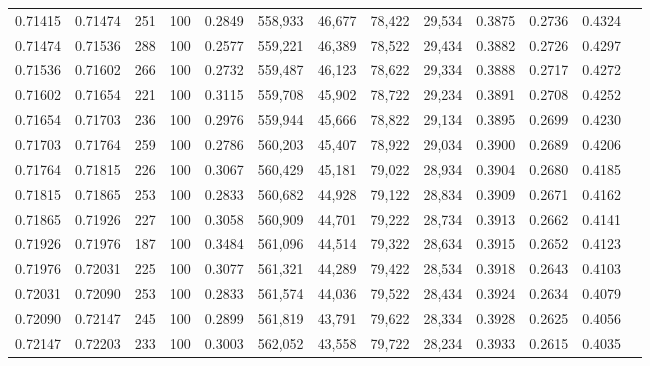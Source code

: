\begin{tabular}{rrrrrrrrrrrrr}
0.71415 & 0.71474 &   251 & 100 &                                     0.2849 & 558,933 &  46,677 &  78,422 &  29,534 & 0.3875 & 0.2736 & 0.4324 \\
0.71474 & 0.71536 &   288 & 100 &                                     0.2577 & 559,221 &  46,389 &  78,522 &  29,434 & 0.3882 & 0.2726 & 0.4297 \\
0.71536 & 0.71602 &   266 & 100 &                                     0.2732 & 559,487 &  46,123 &  78,622 &  29,334 & 0.3888 & 0.2717 & 0.4272 \\
0.71602 & 0.71654 &   221 & 100 &                                     0.3115 & 559,708 &  45,902 &  78,722 &  29,234 & 0.3891 & 0.2708 & 0.4252 \\
0.71654 & 0.71703 &   236 & 100 &                                     0.2976 & 559,944 &  45,666 &  78,822 &  29,134 & 0.3895 & 0.2699 & 0.4230 \\
0.71703 & 0.71764 &   259 & 100 &                                     0.2786 & 560,203 &  45,407 &  78,922 &  29,034 & 0.3900 & 0.2689 & 0.4206 \\
0.71764 & 0.71815 &   226 & 100 &                                     0.3067 & 560,429 &  45,181 &  79,022 &  28,934 & 0.3904 & 0.2680 & 0.4185 \\
0.71815 & 0.71865 &   253 & 100 &                                     0.2833 & 560,682 &  44,928 &  79,122 &  28,834 & 0.3909 & 0.2671 & 0.4162 \\
0.71865 & 0.71926 &   227 & 100 &                                     0.3058 & 560,909 &  44,701 &  79,222 &  28,734 & 0.3913 & 0.2662 & 0.4141 \\
0.71926 & 0.71976 &   187 & 100 &                                     0.3484 & 561,096 &  44,514 &  79,322 &  28,634 & 0.3915 & 0.2652 & 0.4123 \\
0.71976 & 0.72031 &   225 & 100 &                                     0.3077 & 561,321 &  44,289 &  79,422 &  28,534 & 0.3918 & 0.2643 & 0.4103 \\
0.72031 & 0.72090 &   253 & 100 &                                     0.2833 & 561,574 &  44,036 &  79,522 &  28,434 & 0.3924 & 0.2634 & 0.4079 \\
0.72090 & 0.72147 &   245 & 100 &                                     0.2899 & 561,819 &  43,791 &  79,622 &  28,334 & 0.3928 & 0.2625 & 0.4056 \\
0.72147 & 0.72203 &   233 & 100 &                                     0.3003 & 562,052 &  43,558 &  79,722 &  28,234 & 0.3933 & 0.2615 & 0.4035 \\

\end{tabular}
